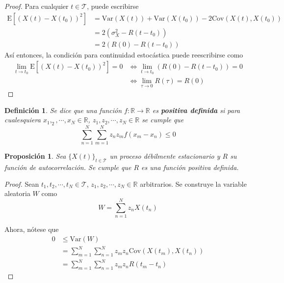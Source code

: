 \documentclass[12pt,letterpaper]{book}
\newtheorem{definicion}{Definición}[chapter]
\newtheorem{proposicion}[teorema]{Proposición}
\newcommand{\R}{\mathbb{R}}
\newcommand{\E}[1]{\mathrm{E}\left[ #1 \right]}
\newcommand{\Var}[1]{\mathrm{Var}\left( #1 \right)}
\newcommand{\Cov}[1]{\mathrm{Cov}\left( #1 \right)}
\newcommand{\xt}{$\{X(t)\}_{t\in \mathcal{T}}$ }
\begin{document}
\begin{proof}
Para cualquier $t\in \mathcal{T}$, puede escribirse
\begin{align*}
\E{\left( X(t) - X(t_0) \right)^{2}} &= \Var{X(t)} + \Var{X(t_0)} - 2 \Cov{X(t),X(t_0)} \\
&= 2 \left( \sigma_X^{2} - R(t-t_0) \right) \\
&= 2 \left( R(0) - R(t-t_0) \right)
\end{align*}
Así entonces, la condición para continuidad estocástica puede reescribirse como
\begin{align*}
\lim_{t \rightarrow t_0} \E{\left( X(t) - X(t_0) \right)^{2}} = 0 
&\Leftrightarrow
\lim_{t \rightarrow t_0} \left( R(0) - R(t-t_0) \right) = 0 \\
&\Leftrightarrow
\lim_{\tau \rightarrow 0} R(\tau) = R(0)
\end{align*}
\end{proof}

\begin{definicion}
Se dice que una función $f: \R\rightarrow \R$ es \textbf{positiva definida} si para cualesquiera $x_1, _2, \cdots, x_N \in \R$, $z_1, z_2, \cdots, z_N \in \R$ se cumple que 
\begin{equation}
\sum_{n=1}^{N} \sum_{m=1}^{N} z_n z_m f(x_m-x_n) \leq 0
\end{equation}
\end{definicion}

\begin{proposicion}
Sea \xt un proceso débilmente estacionario y $R$ su función de autocorrelación. Se cumple que $R$ es una función positiva definida.
\label{lazy:meh}
\end{proposicion}

\begin{proof}
Sean $t_1, t_2, \cdots, t_N \in \mathcal{T}$, $z_1, z_2, \cdots, z_N \in \R$ arbitrarios. Se construye la variable aleatoria $W$ como
\begin{equation}
W = \sum_{n=1}^{N} z_n X(t_n)
\end{equation}

Ahora, nótese que
\begin{align*}
0 &\leq \Var{W} \\
&= \sum_{m=1}^{N} \sum_{n=1}^{N} z_m z_n \Cov{X(t_m),X(t_n)} \\
&= \sum_{m=1}^{N} \sum_{n=1}^{N} z_m z_n R(t_m-t_n)
\end{align*}
\end{proof}
\end{document}
